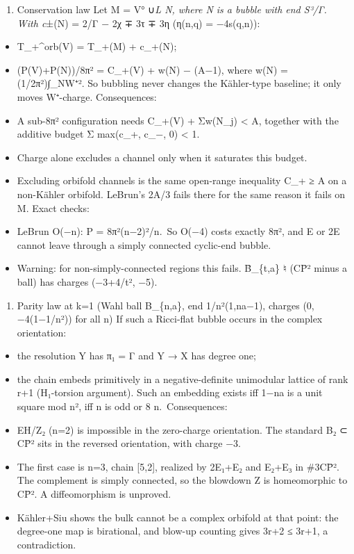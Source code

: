 \documentclass[
  10pt,
]{report}
\providecommand{\tightlist}{%
  \setlength{\itemsep}{0pt}\setlength{\parskip}{0pt}}
\begin{document}
\begin{enumerate}
\def\labelenumi{\arabic{enumi}.}
\tightlist
\item
  Conservation law Let M = V° ∪\emph{L N, where N is a bubble with end
  S³/Γ. With c}±(N) = 2/\textbar Γ\textbar{} − 2χ ∓ 3τ ∓ 3η (η(n,q) =
  −4s(q,n)):
\end{enumerate}

\begin{itemize}
\tightlist
\item
  T\_+\^{}orb(V) = T\_+(M) + c\_+(N);
\item
  (P(V)+P(N))/8π² = C\_+(V) + w(N) − (A−1), where w(N) =
  (1/2π²)∫\_N\textbar W⁺\textbar². So bubbling never changes the
  Kähler-type baseline; it only moves W⁺-charge. Consequences:
\item
  A sub-8π² configuration needs C\_+(V) + Σw(N\_j) \textless{} A,
  together with the additive budget Σ max(c\_+, c\_−, 0) \textless{} 1.
\item
  Charge alone excludes a channel only when it saturates this budget.
\item
  Excluding orbifold channels is the same open-range inequality C\_+ ≥ A
  on a non-Kähler orbifold. LeBrun's 2A/3 fails there for the same
  reason it fails on M. Exact checks:
\item
  LeBrun O(−n): P = 8π²(n−2)²/n.~So O(−4) costs exactly 8π², and E or 2E
  cannot leave through a simply connected cyclic-end bubble.
\item
  Warning: for non-simply-connected regions this fails. B̄\_\{t,a\} ♮
  (CP̄² minus a ball) has charges (−3+4/t², −5).
\end{itemize}

\begin{enumerate}
\def\labelenumi{\arabic{enumi}.}
\setcounter{enumi}{1}
\tightlist
\item
  Parity law at k=1 (Wahl ball B\_\{n,a\}, end 1/n²(1,na−1), charges (0,
  −4(1−1/n²)) for all n) If such a Ricci-flat bubble occurs in the
  complex orientation:
\end{enumerate}

\begin{itemize}
\tightlist
\item
  the resolution Y has π₁ = Γ and Y → X has degree one;
\item
  the chain embeds primitively in a negative-definite unimodular lattice
  of rank r+1 (H₁-torsion argument). Such an embedding exists iff 1−na
  is a unit square mod n², iff n is odd or 8 \textbar{} n.~Consequences:
\item
  EH/Z₂ (n=2) is impossible in the zero-charge orientation. The standard
  B₂ ⊂ CP̄² sits in the reversed orientation, with charge −3.
\item
  The first case is n=3, chain {[}5,2{]}, realized by 2E₁+E₂ and E₂+E₃
  in \#3CP̄². The complement is simply connected, so the blowdown Z is
  homeomorphic to CP̄². A diffeomorphism is unproved.
\item
  Kähler+Siu shows the bulk cannot be a complex orbifold at that point:
  the degree-one map is birational, and blow-up counting gives 3r+2 ≤
  3r+1, a contradiction.
\end{itemize}
\end{document}

